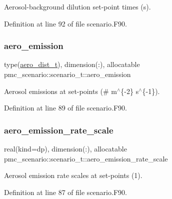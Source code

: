 Aerosol-\/background dilution set-\/point times (s). 



Definition at line 92 of file scenario.\+F90.

\mbox{\label{structpmc__scenario_1_1scenario__t_abba92de66da9633dd5bfe981893fa01f}} 
\subsubsection{\texorpdfstring{aero\+\_\+emission}{aero\_emission}}
{\footnotesize\ttfamily type(\mbox{\hyperlink{structpmc__aero__dist_1_1aero__dist__t}{aero\+\_\+dist\+\_\+t}}), dimension(\+:), allocatable pmc\+\_\+scenario\+::scenario\+\_\+t\+::aero\+\_\+emission}



Aerosol emissions at set-\/points (\# m$^\wedge$\{-\/2\} s$^\wedge$\{-\/1\}). 



Definition at line 89 of file scenario.\+F90.

\mbox{\label{structpmc__scenario_1_1scenario__t_a7eba11dd31535de2e512696c01080f33}} 
\subsubsection{\texorpdfstring{aero\+\_\+emission\+\_\+rate\+\_\+scale}{aero\_emission\_rate\_scale}}
{\footnotesize\ttfamily real(kind=dp), dimension(\+:), allocatable pmc\+\_\+scenario\+::scenario\+\_\+t\+::aero\+\_\+emission\+\_\+rate\+\_\+scale}



Aerosol emission rate scales at set-\/points (1). 



Definition at line 87 of file scenario.\+F90.

